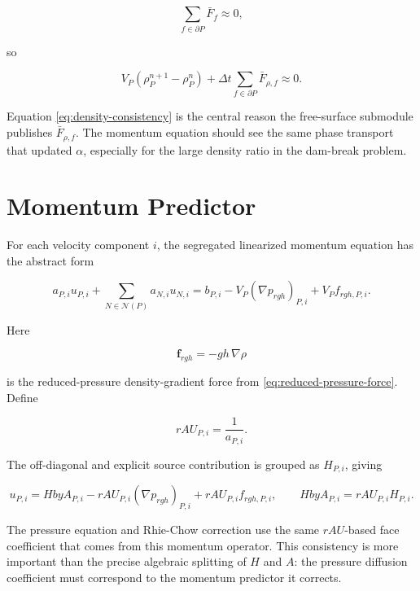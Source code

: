 \documentclass[11pt]{article}
\newcommand{\grad}{\nabla}
\newcommand{\nb}{\mathcal{N}}
\begin{document}
\begin{equation}
  \sum_{f\in\partial P}\bar{F}_f\approx 0,
\end{equation}

so

\begin{equation}
  V_P(\rho_P^{n+1}-\rho_P^n)
  +
  \Delta t
  \sum_{f\in\partial P}
  \bar{F}_{\rho,f}
  \approx 0.
  \label{eq:density-consistency}
\end{equation}

Equation \eqref{eq:density-consistency} is the central reason the
free-surface submodule publishes \(\bar{F}_{\rho,f}\).  The momentum equation
should see the same phase transport that updated \(\alpha\), especially for the
large density ratio in the dam-break problem.

\section{Momentum Predictor}

For each velocity component \(i\), the segregated linearized momentum equation
has the abstract form

\begin{equation}
  a_{P,i}u_{P,i}
  +
  \sum_{N\in\nb(P)}
  a_{N,i}u_{N,i}
  =
  b_{P,i}
  -
  V_P(\grad p_{rgh})_{P,i}
  +
  V_P f_{rgh,P,i}.
  \label{eq:momentum-discrete}
\end{equation}

Here

\begin{equation}
  \mathbf{f}_{rgh}=-gh\,\grad\rho
\end{equation}

is the reduced-pressure density-gradient force from
\eqref{eq:reduced-pressure-force}.  Define

\begin{equation}
  rAU_{P,i}=\frac{1}{a_{P,i}}.
\end{equation}

The off-diagonal and explicit source contribution is grouped as \(H_{P,i}\),
giving

\begin{equation}
  u_{P,i}
  =
  HbyA_{P,i}
  -
  rAU_{P,i}(\grad p_{rgh})_{P,i}
  +
  rAU_{P,i}f_{rgh,P,i},
  \qquad
  HbyA_{P,i}=rAU_{P,i}H_{P,i}.
\end{equation}

The pressure equation and Rhie-Chow correction use the same \(rAU\)-based face
coefficient that comes from this momentum operator.  This consistency is more
important than the precise algebraic splitting of \(H\) and \(A\): the pressure
diffusion coefficient must correspond to the momentum predictor it corrects.
\end{document}
